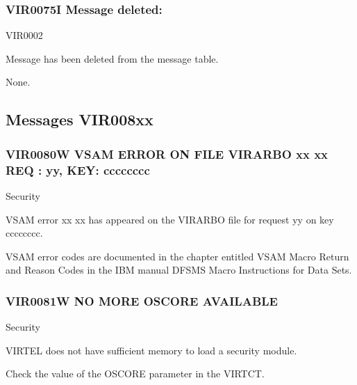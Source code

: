 \documentclass[letterpaper,10pt,english]{sphinxmanual}
\begin{document}
\subsubsection{VIR0075I Message deleted: }
\label{\detokenize{messages:vir0075i-message-deleted-messageid}}\begin{description}
\sphinxAtStartPar
VIR0002

\sphinxAtStartPar
Message  has been deleted from the message table.

\sphinxAtStartPar
None.

\end{description}


\subsection{Messages VIR008xx}
\label{\detokenize{messages:messages-vir008xx}}

\subsubsection{VIR0080W VSAM ERROR ON FILE VIRARBO xx xx REQ : yy, KEY: cccccccc}
\label{\detokenize{messages:vir0080w-vsam-error-on-file-virarbo-xx-xx-req-yy-key-cccccccc}}\begin{description}
\sphinxAtStartPar
Security

\sphinxAtStartPar
VSAM error xx xx has appeared on the VIRARBO file for request yy on key cccccccc.

\sphinxAtStartPar
VSAM error codes are documented in the chapter entitled VSAM Macro Return and Reason Codes in the IBM manual DFSMS Macro Instructions for Data Sets.

\end{description}


\subsubsection{VIR0081W NO MORE OSCORE AVAILABLE}
\label{\detokenize{messages:vir0081w-no-more-oscore-available}}\begin{description}
\sphinxAtStartPar
Security

\sphinxAtStartPar
VIRTEL does not have sufficient memory to load a security module.

\sphinxAtStartPar
Check the value of the OSCORE parameter in the VIRTCT.

\end{description}
\end{document}

